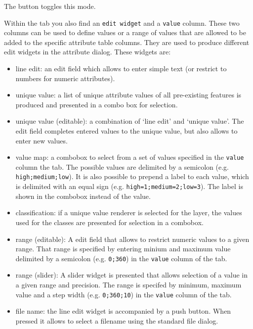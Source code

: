 The  button toggles this mode.


Within the  tab you also find an \texttt{edit widget} and a 
\texttt{value} column. These two columns can be used to define values or a range 
of values that are allowed to be added to the specific attribute table columns. 
They are used to produce different edit widgets in the attribute dialog. These 
widgets are:

\begin{itemize}
\item line edit: an edit field which allows to enter simple text (or restrict to 
numbers for numeric attributes).
\item unique value: a list of unique attribute values of all pre-existing features
is produced and presented in a combo box for selection.
\item  unique value (editable): a combination of `line edit' and `unique value'.
The edit field completes entered values to the unique value, but also allows
to enter new values.
\item value map: a combobox to select from a set of values specified in the
\texttt{value} column the  tab.  The possible values are 
delimited by a semicolon (e.g. \verb|high;medium;low|).  It is also possible
to prepend a label to each value, which is delimited with an equal sign (e.g.
\verb|high=1;medium=2;low=3|). The label is shown in the combobox instead of
the value.
\item classification: if a unique value renderer is selected for the layer, the
values used for the classes are presented for selection in a combobox.
\item range (editable): A edit field that allows to restrict numeric values to a
given range.  That range is specified by entering minium and maximum value
delimited by a semicolon (e.g. \verb|0;360|) in the \texttt{value} column of
the  tab.
\item range (slider): A slider widget is presented that allows selection of a value
in a given range and precision.  The range is specifed by minimum, maximum
value and a step width (e.g. \verb|0;360;10|) in the \texttt{value} column of
the  tab.
\item file name: the line edit widget is accompanied by a push button. When pressed
it allows to select a filename using the standard file dialog.
\end{itemize}

